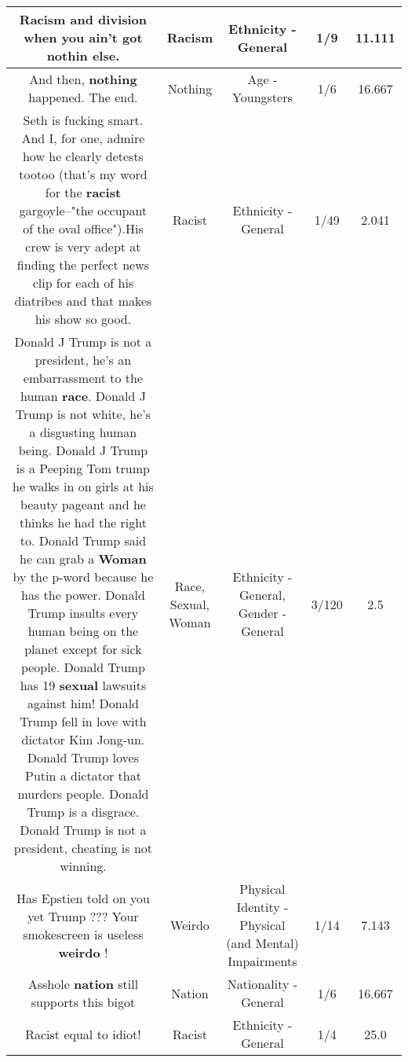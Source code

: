 \documentclass[11pt]{article}
\newlength\mylength
\begin{document}
\begin{center}
\begin{longtable}{|C{.65\mylength}|C{.30\mylength}|C{.12\mylength}|C{.12\mylength}|C{.12\mylength}|}
  \small Racism and division when you ain't got nothin else.\normalsize   & Racism & Ethnicity - General & 1/9 & 11.111 \\  \hline
  \small And then, \textbf{nothing} happened. The end.\normalsize   & Nothing & Age - Youngsters & 1/6 & 16.667 \\  \hline
  \small Seth is fucking smart. And I, for one, admire how he clearly detests   tootoo (that's my word for the \textbf{racist} gargoyle--"the occupant of the oval office").His crew is very adept at finding the perfect news clip for each of his diatribes and that makes his show so good.\normalsize   & Racist & Ethnicity - General & 1/49 & 2.041 \\  \hline
  \small Donald J Trump is not a president, he's an embarrassment to the human \textbf{race}. Donald J Trump is not white, he's a disgusting human being. Donald J Trump is a Peeping Tom trump he walks in on girls at his beauty pageant and he thinks he had the right to.  Donald Trump said he can grab a \textbf{Woman} by the p-word because he has the power. Donald Trump insults every human being on the planet except for sick people. Donald Trump has 19 \textbf{sexual} lawsuits against him! Donald Trump fell in love with dictator Kim Jong-un. Donald Trump loves Putin a dictator that murders people. Donald Trump is a disgrace. Donald Trump is not a president, cheating is not winning.\normalsize   & Race, Sexual, Woman & Ethnicity - General, Gender - General & 3/120 & 2.5 \\  \hline
  \small Has Epstien told on you yet Trump ??? Your smokescreen is useless \textbf{weirdo} !\normalsize   & Weirdo & Physical Identity - Physical (and Mental) Impairments & 1/14 & 7.143 \\  \hline
  \small Asshole \textbf{nation} still supports this bigot\normalsize   & Nation & Nationality - General & 1/6 & 16.667 \\  \hline
  \small Racist equal to idiot!\normalsize   & Racist & Ethnicity - General & 1/4 & 25.0 \\  \hline

\end{longtable}
\end{center}
\end{document}
